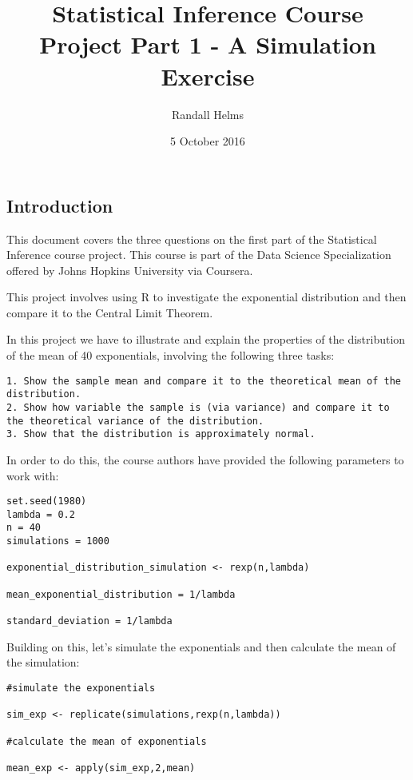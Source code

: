 \documentclass[]{article}
\title{Statistical Inference Course Project Part 1 - A Simulation Exercise}
\author{Randall Helms}
\date{5 October 2016}
\begin{document}
\maketitle

\subsection{Introduction}\label{introduction}

This document covers the three questions on the first part of the
Statistical Inference course project. This course is part of the Data
Science Specialization offered by Johns Hopkins University via Coursera.

This project involves using R to investigate the exponential
distribution and then compare it to the Central Limit Theorem.

In this project we have to illustrate and explain the properties of the
distribution of the mean of 40 exponentials, involving the following
three tasks:

\begin{verbatim}
1. Show the sample mean and compare it to the theoretical mean of the distribution.
2. Show how variable the sample is (via variance) and compare it to the theoretical variance of the distribution.
3. Show that the distribution is approximately normal.
\end{verbatim}

In order to do this, the course authors have provided the following
parameters to work with:

\begin{verbatim}
set.seed(1980)
lambda = 0.2
n = 40
simulations = 1000

exponential_distribution_simulation <- rexp(n,lambda)

mean_exponential_distribution = 1/lambda

standard_deviation = 1/lambda
\end{verbatim}

Building on this, let's simulate the exponentials and then calculate the
mean of the simulation:

\begin{verbatim}
#simulate the exponentials

sim_exp <- replicate(simulations,rexp(n,lambda))

#calculate the mean of exponentials

mean_exp <- apply(sim_exp,2,mean)
\end{verbatim}
\end{document}
